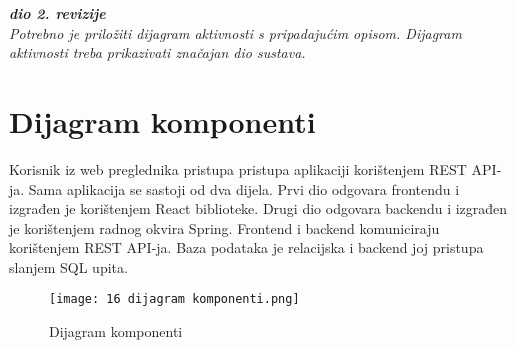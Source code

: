 			\textbf{\textit{dio 2. revizije}}\\
			
			 \textit{Potrebno je priložiti dijagram aktivnosti s pripadajućim opisom. Dijagram aktivnosti treba prikazivati značajan dio sustava.}
			
			\eject
		\section{Dijagram komponenti}
		
		 Korisnik iz web preglednika pristupa pristupa aplikaciji korištenjem REST API-ja. Sama aplikacija se sastoji od dva dijela. Prvi dio odgovara frontendu i izgrađen je korištenjem React biblioteke. Drugi dio odgovara backendu i izgrađen je korištenjem radnog okvira Spring. Frontend i backend komuniciraju korištenjem REST API-ja. Baza podataka je relacijska i backend joj pristupa slanjem SQL upita.
		
			\begin{figure}[H]
					\centering
					\texttt{[image: 16 dijagram komponenti.png]}
					\caption{Dijagram komponenti}
				\end{figure}	
				\newpage			
